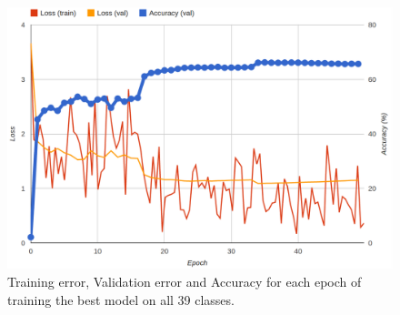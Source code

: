 \begin{figure}[H]
\centering
\includegraphics[scale=0.25]{figs/allclass.png}
\caption{\label{fig:best}Training error, Validation error and Accuracy for each epoch of training the best model on all 39 classes.}
\end{figure}




